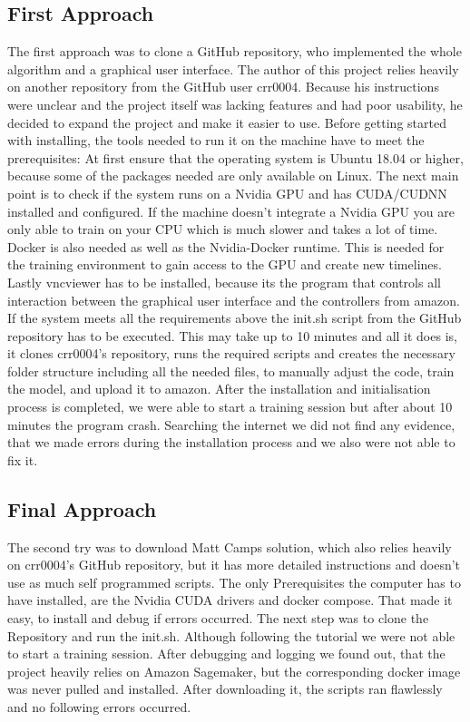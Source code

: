 \subsection{First Approach}
The first approach was to clone a GitHub repository, who implemented the whole algorithm and a graphical user interface. The author of this project relies heavily on another repository from the GitHub user crr0004. Because his instructions were unclear and the project itself was lacking features and had poor usability, he decided to expand the project and make it easier to use. 
Before getting started with installing, the tools needed to run it on the machine have to meet the prerequisites:
At first ensure that the operating system is Ubuntu 18.04 or higher, because some of the packages needed are only available on Linux.
The next main point is to check if the system runs on a Nvidia GPU and has CUDA/CUDNN installed and configured. If the machine doesn't integrate a Nvidia GPU you are only able to train on your CPU which is much slower and takes a lot of time.
Docker is also needed as well as the Nvidia-Docker runtime. This is needed for the training environment to gain access to the GPU and create new
timelines.
Lastly vncviewer has to be installed, because its the program that controls all interaction between the graphical user interface and the controllers from amazon.
If the system meets all the requirements above the init.sh script from the GitHub repository has to be executed.
This may take up to 10 minutes and all it does is, it clones crr0004's repository, runs the required scripts and creates the necessary folder structure including all the needed files, to manually adjust the code, train the model, and upload it to amazon.
After the installation and initialisation process is completed, we were able to start a training session but after about 10 minutes the program crash. Searching the internet we did not find any evidence, that we made errors during the installation process and we also were not able to fix it.

\subsection{Final Approach}
The second try was to download Matt Camps solution, which also relies heavily on crr0004's GitHub repository, but it has more detailed instructions and doesn't use as much self programmed scripts. The only Prerequisites the computer has to have installed, are the Nvidia CUDA drivers and docker compose. That made it easy, to install and debug if errors occurred. The next step was to clone the Repository and run the init.sh. Although following the tutorial we were not able to start a training session. After debugging and logging we found out, that the project heavily relies on Amazon Sagemaker, but the corresponding docker image was never pulled and installed. After downloading it, the scripts ran flawlessly and no following errors occurred.

